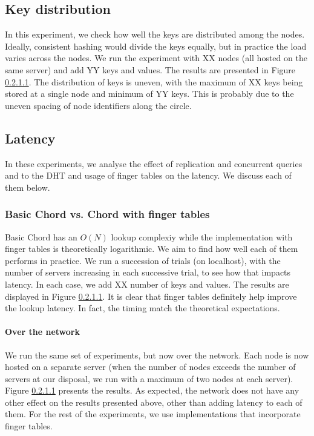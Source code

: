 \documentclass{sig-alternate-10pt}
\begin{document}
\subsection{Key distribution}
In this experiment, we check how well the keys are distributed among the nodes. Ideally, consistent hashing would divide the keys equally, but in practice the load varies across the nodes. We run the experiment with XX nodes (all hosted on the same server) and add YY keys and values. The results are presented in Figure \ref{}. The distribution of keys is uneven, with the maximum of XX keys being stored at a single node and minimum of YY keys. This is probably due to the uneven spacing of node identifiers along the circle.

\subsection{Latency}
In these experiments, we analyse the effect of replication and concurrent queries and to the DHT and usage of finger tables on the latency. We discuss each of them below.
\subsubsection{Basic Chord vs. Chord with finger tables}
Basic Chord has an $O(N)$ lookup complexiy while the implementation with finger tables is theoretically logarithmic. We aim to find how well each of them performs in practice. We run a succession of trials (on localhost), with the number of servers increasing in each successive trial, to see how that impacts latency. In each case, we add XX number of keys and values. The results are displayed in Figure \ref{}. It is clear that finger tables definitely help improve the lookup latency. In fact, the timing match the theoretical expectations.

\paragraph{Over the network}
We run the same set of experiments, but now over the network. Each node is now hosted on a separate server (when the number of nodes exceeds the number of servers at our disposal, we run with a maximum of two nodes at each server). Figure \ref{} presents the results. As expected, the network does not have any other effect on the results presented above, other than adding latency to each of them.
For the rest of the experiments, we use implementations that incorporate finger tables.
\end{document}
